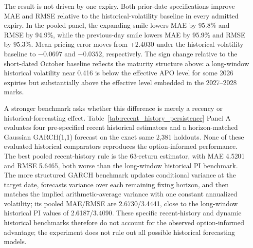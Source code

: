 The result is not driven by one expiry. Both prior-date specifications improve MAE and RMSE relative to the historical-volatility baseline in every admitted expiry. In the pooled panel, the expanding smile lowers MAE by 95.8\% and RMSE by 94.9\%, while the previous-day smile lowers MAE by 95.9\% and RMSE by 95.3\%. Mean pricing error moves from +2.4030 under the historical-volatility baseline to $-0.0697$ and $-0.0352$, respectively. The sign change relative to the short-dated October baseline reflects the maturity structure above: a long-window historical volatility near 0.416 is below the effective APO level for some 2026 expiries but substantially above the effective level embedded in the 2027--2028 marks.

A stronger benchmark asks whether this difference is merely a recency or historical-forecasting effect. Table~\ref{tab:recent_history_persistence} Panel A evaluates four pre-specified recent historical estimators and a horizon-matched Gaussian GARCH(1,1) forecast on the exact same 2,381 holdouts. None of these evaluated historical comparators reproduces the option-informed performance. The best pooled recent-history rule is the 63-return estimator, with MAE 4.5201 and RMSE 5.6465, both worse than the long-window historical PI benchmark. The more structured GARCH benchmark updates conditional variance at the target date, forecasts variance over each remaining fixing horizon, and then matches the implied arithmetic-average variance with one constant annualized volatility; its pooled MAE/RMSE are 2.6730/3.4441, close to the long-window historical PI values of 2.6187/3.4090. These specific recent-history and dynamic historical benchmarks therefore do not account for the observed option-informed advantage; the experiment does not rule out all possible historical forecasting models.

